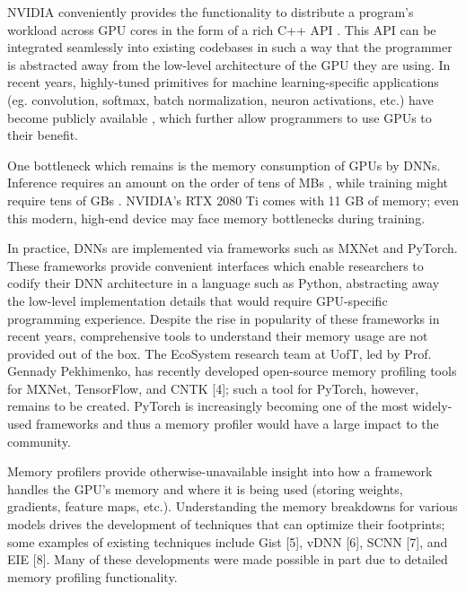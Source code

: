 \documentclass[12pt,letterpaper]{article}
\begin{document}
NVIDIA conveniently provides the functionality to distribute a program's workload across GPU cores in the form of a rich C++ API \cite{cuda_guide}. This API can be integrated seamlessly into existing codebases in such a way that the programmer is abstracted away from the low-level architecture of the GPU they are using. In recent years, highly-tuned primitives for machine learning-specific applications (eg. convolution, softmax, batch normalization, neuron activations, etc.) have become publicly available \cite{cudnn}, which further allow programmers to use GPUs to their benefit.
\par 

One bottleneck which remains is the memory consumption of GPUs by DNNs. Inference requires an amount on the order of tens of MBs \cite{deep_compression}, while training might require tens of GBs \cite{vdnn}. NVIDIA’s RTX 2080 Ti comes with 11 GB of memory; even this modern, high-end device may face memory bottlenecks during training. \par 

In practice, DNNs are implemented via frameworks such as MXNet and PyTorch. These frameworks provide convenient interfaces which enable researchers to codify their DNN architecture in a language such as Python, abstracting away the low-level implementation details that would require GPU-specific programming experience. Despite the rise in popularity of these frameworks in recent years, comprehensive tools to understand their memory usage are not provided out of the box. The EcoSystem research team at UofT, led by Prof. Gennady Pekhimenko, has recently developed open-source memory profiling tools for MXNet, TensorFlow, and CNTK [4]; such a tool for PyTorch, however, remains to be created. PyTorch is increasingly becoming one of the most widely-used frameworks and thus a memory profiler would have a large impact to the community.
\par

Memory profilers provide otherwise-unavailable insight into how a framework handles the GPU’s memory and where it is being used (storing weights, gradients, feature maps, etc.). Understanding the memory breakdowns for various models drives the development of techniques that can optimize their footprints; some examples of existing techniques include Gist [5], vDNN [6], SCNN [7], and EIE [8]. Many of these developments were made possible in part due to detailed memory profiling functionality. 
\par
\end{document}
